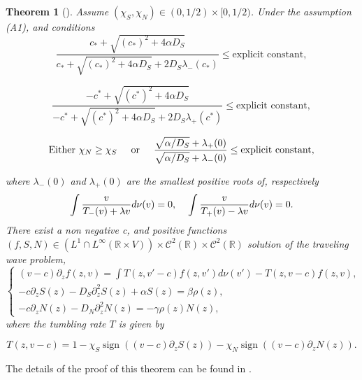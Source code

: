 \documentclass[11pt,twoside]{article}
\numberwithin{equation}{section}
\DeclareMathOperator{\sign}{sign}
\theoremstyle{plain}
\newtheorem{theorem}{Theorem}[section]
\theoremstyle{nonumberplain}
\begin{document}
\begin{theorem}[\cite{calvez2019chemotactic}] \label{theorem_existence_mesos}
 Assume $(\chi_S, \chi_N) \in (0, 1/2) \times [0, 1/2)$. Under the assumption (A1), and conditions 
\begin{equation} 
    \frac{c_* + \sqrt{(c_*)^2 + 4 \alpha D_S}}{c_* + \sqrt{(c_*)^2 + 4 \alpha D_S} + 2D_S \lambda_-(c_*)} \le \text{explicit constant},
    \label{constraint1}
\end{equation}

\begin{equation}
    \frac{-c^* + \sqrt{(c^*)^2 + 4 \alpha D_S}}{-c^* + \sqrt{(c^*)^2 + 4 \alpha D_S} + 2D_S \lambda_+(c^*)} \le \text{explicit constant},
    \label{constraint2}
\end{equation}

\begin{equation}
    \text{Either } \chi_N \ge \chi_S \hspace{0.5cm} \text{or} \hspace{0.5cm} \frac{\sqrt{\alpha / D_S} + \lambda_+ (0)}{\sqrt{\alpha / D_S} + \lambda_- (0)} \le \text{explicit constant},
    \label{constraint3}
\end{equation}

where $\lambda_-(0)$ and $\lambda_+(0)$
 are the smallest positive roots of, respectively 
 \begin{equation}
     \int \frac{v}{T_-(v) + \lambda v} d\nu (v) = 0, \hspace{0.4cm} \int \frac{v}{T_+(v) - \lambda v} d \nu (v) = 0.
     \nonumber
 \end{equation}
 There exist a non negative c, and positive functions $(f, S, N) \in (L^1 \cap L^\infty (\mathbb{R} \times V)) \times \mathcal{C}^2(\mathbb{R}) \times \mathcal{C}^2 (\mathbb{R})$ solution of the traveling wave problem,
 \begin{equation}
         \left \{
    \begin{aligned}
       (v-c) \partial_z f(z,v) = \int T(z, v'-c)f(z,v') d\nu (v') - T(z, v-c)f(z,v),\\
       -c \partial_z S(z) - D_S \partial_z^2 S(z) + \alpha S(z) = \beta \rho (z),\\
       -c \partial_z N(z) - D_N \partial_z^2 N(z) = - \gamma \rho (z) N(z),
    \end{aligned}
  \right .
  \label{eq_sys_mesoscopic}
\end{equation}
where the tumbling rate $T$ is given by 

\[
    T(z, v-c) = 1 - \chi_S \sign((v-c)\partial_zS(z)) - \chi_N \sign((v-c)\partial_zN(z)) .
\]

\end{theorem}
The details of the proof of this theorem can be found in \cite{calvez2019chemotactic}.
\end{document}
